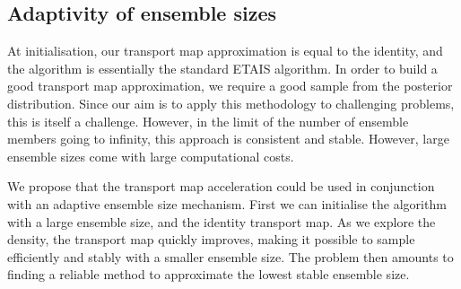 \documentclass[final]{siamltex}
\begin{document}
\subsection{Adaptivity of ensemble sizes}
At initialisation, our transport map approximation is equal to the
identity, and the algorithm is essentially the standard ETAIS
algorithm. In order to build a good transport map approximation, we
require a good sample from the posterior distribution. Since our aim
is to apply this methodology to challenging problems, this is itself a
challenge. However, in the limit of the number of ensemble members
going to infinity, this approach is consistent and stable. However,
large ensemble sizes come with large computational costs.

We propose that the transport map acceleration could be used in
conjunction with an adaptive ensemble size mechanism. First we can
initialise the algorithm with a large ensemble size, and the identity transport map. As
we explore the density, the transport map quickly improves, making it
possible to sample efficiently and stably with a smaller ensemble
size. The problem then amounts to finding a reliable method to
approximate the lowest stable ensemble size.





\end{document}
